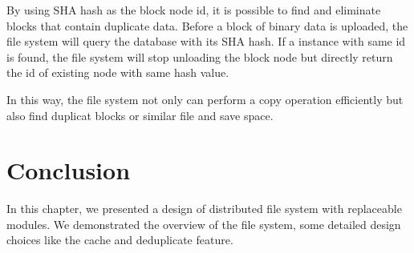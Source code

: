     By using SHA hash as the block node id, it is possible to find and eliminate blocks that contain duplicate data. Before a block of binary data is uploaded, the file system will query the database with its SHA hash. If a instance with same id is found, the file system will stop unloading the block node but directly return the id of existing node with same hash value.

    In this way, the file system not only can perform a copy operation efficiently but also find duplicat blocks or similar file and save space. 

\section{Conclusion}

    In this chapter, we presented a design of distributed file system with replaceable modules. We demonstrated the overview of the file system, some detailed design choices like the cache and deduplicate feature.
